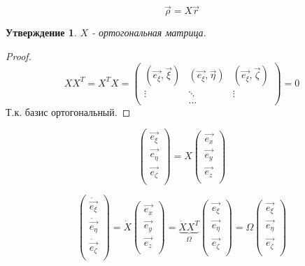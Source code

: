 \documentclass{article}
\renewcommand{\v}[1]{{\vec{#1}}}
\newtheorem{ass}{Утверждение}
\begin{document}
  $$ \v{\rho} = X \v{r} $$
  
  \begin{ass}
  $X$ - ортогональная матрица.
  \end{ass}
  \begin{proof}
  $$ XX^T = X^TX = 
  \left(
  \begin{matrix}
  (\v{e_{\xi}}, \v{\xi}) & 
  (\v{e_{\xi}}, \v{\eta}) & 
  (\v{e_{\xi}}, \v{\zeta}) \\
  \vdots & \ddots & \vdots \\
   & \ldots &
  \end{matrix} 
  \right)
  = 0 $$
  Т.к. базис ортогональный.
  \end{proof} 
  
  $$
  \left(
  \begin{matrix}
  \v{e_{\xi}} \\
  \v{e_{\eta}} \\
  \v{e_{\zeta}} \\
  \end{matrix}
  \right)  
  =  
  X
  \left(
  \begin{matrix}
  \v{e_{x}} \\
  \v{e_{y}} \\
  \v{e_{z}} \\
  \end{matrix}
  \right)
  $$

  $$
  \left(
  \begin{matrix}
  \dot{\v{e_{\xi}}} \\
  \dot{\v{e_{\eta}}} \\
  \dot{\v{e_{\zeta}}} \\  
  \end{matrix}
  \right)
  = 
  \dot{X}
  \left(
  \begin{matrix}
  \v{e_{x}} \\
  \v{e_{y}} \\
  \v{e_{z}} \\
  \end{matrix}
  \right) =
  \underbrace{
  \dot{X} X^T
  }_{\Omega}
  \left(
  \begin{matrix}
  \v{e_{\xi}} \\
  \v{e_{\eta}} \\
  \v{e_{\zeta}} \\
  \end{matrix}
  \right)
  =
  \Omega
  \left(
  \begin{matrix}
  \v{e_{\xi}} \\
  \v{e_{\eta}} \\
  \v{e_{\zeta}} \\
  \end{matrix}
  \right) 
  $$
\end{document}
